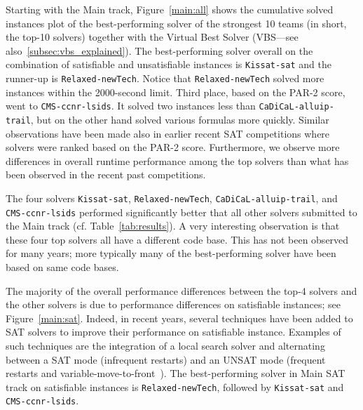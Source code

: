 \documentclass{elsarticle}
\newcommand{\solver}[1]{\texttt{#1}}
\begin{document}
Starting with the Main track, 
Figure~\ref{main:all} shows the cumulative solved instances plot of the best-performing solver of the strongest
10 teams (in short, the top-10 solvers)  together with the Virtual Best Solver (VBS---see also~\ref{subsec:vbs_explained}).
The best-performing  solver overall on the combination of satisfiable and unsatisfiable instances
is \solver{Kissat-sat} and the runner-up is \solver{Relaxed-newTech}. Notice that
\solver{Relaxed-newTech} solved more instances within the 2000-second limit.
Third place, based on the PAR-2 score, went to \solver{CMS-ccnr-lsids}. It solved two  instances less than
\solver{CaDiCaL-alluip-trail}, but on the other hand solved various formulas more quickly.
Similar observations have been made also in earlier recent SAT competitions where 
solvers were ranked based on the PAR-2 score.
Furthermore, we observe more differences in overall runtime performance among the top solvers than what has been observed
in the recent past competitions.

The four solvers \solver{Kissat-sat}, \solver{Relaxed-newTech}, \solver{CaDiCaL-alluip-trail}, and \solver{CMS-ccnr-lsids} 
performed significantly better that all other solvers submitted to the Main track (cf. Table~\ref{tab:results}).
A very interesting observation is that these four top solvers all have a different code base. This has not been observed for many years; more typically
many of the best-performing solver have been based on same code bases.

The majority of the overall performance differences
 between the top-4 solvers and the other solvers 
is due to performance differences on satisfiable instances;
see Figure~\ref{main:sat}. Indeed, in recent years, several techniques have been added to SAT solvers to improve
their performance on satisfiable instance. Examples of such techniques are the integration of a local search
solver and alternating between a SAT mode (infrequent restarts) and an UNSAT mode (frequent restarts
and variable-move-to-front~\cite{Ryan:2004:Thesis}). The best-performing solver in  Main SAT track on satisfiable instances is \solver{Relaxed-newTech}, followed by
\solver{Kissat-sat} and \solver{CMS-ccnr-lsids}.
\end{document}
